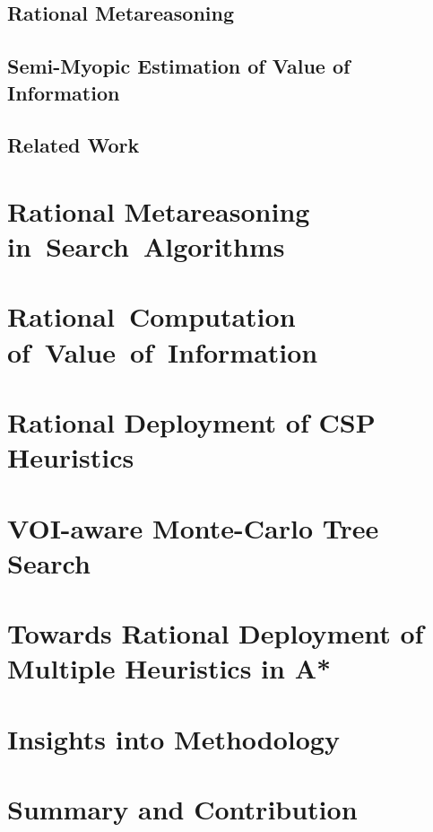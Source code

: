 \documentclass[oneside]{report}
\begin{document}
\section{Rational Metareasoning}
\label{sec:ratimeta}


\section{Semi-Myopic Estimation of Value of Information}
\label{sec:blinkered}


\section{Related Work}
\label{sec:related}


\chapter{Rational Metareasoning in~Search~Algorithms}
\label{ch:ramesrch}


\chapter{Rational~Computation of~Value~of~Information}
\label{ch:raticomp}


\chapter{Rational Deployment of CSP Heuristics}
\label{ch:cs-csp}


\chapter{VOI-aware Monte-Carlo Tree Search}
\label{ch:cs-mcts}


\chapter{Towards Rational Deployment of Multiple Heuristics in A*}
\label{ch:cs-rla}


\chapter{Insights into Methodology}
\label{ch:insights}


\chapter {Summary and Contribution}
\label{ch:summary}




\end{document}
